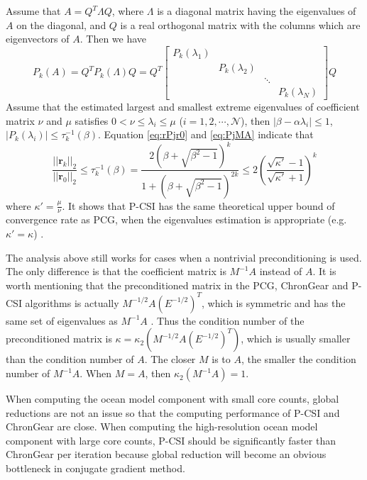 Assume that $A= Q^T\Lambda Q$, where $\Lambda$ is a diagonal matrix having the eigenvalues of $A$ on the diagonal, and $Q$ is a real orthogonal matrix with the columns which are eigenvectors of $A$.
Then we have
\begin{equation}
P_k(A) = Q^T P_k(\Lambda)Q = Q^T \left [\begin{array}{cccc}
P_k(\lambda_1) & & &\\
& P_k(\lambda_2) & &\\
& & \ddots &\\
 & & & P_k(\lambda_N)
\end{array} \right ] Q \label{eq:PjMA}
\end{equation}
Assume that the estimated largest and smallest extreme eigenvalues of coefficient matrix $\nu$ and $\mu$ satisfies $0 < \nu \le \lambda_i \le \mu$ ($i = 1, 2, \cdots, \mathcal{N}$), then $|\beta - \alpha \lambda_i| \le 1$, $|P_k(\lambda_i)| \le \tau^{-1}_k (\beta)$.
Equation \ref{eq:rPjr0} and \ref{eq:PjMA} indicate that
\begin{equation}
\label{pcsi_convergence}
\frac{||\textbf{r}_k||_2}{||\textbf{r}_0||_2}  \le  \tau_k^{-1}(\beta) = \frac{2(\beta+\sqrt{\beta^2-1})^k}{1+(\beta+\sqrt{\beta^2-1})^{2k}} \le 2(\frac{\sqrt{\kappa'}-1}{\sqrt{\kappa'}+1})^k
\end{equation}
where $\kappa' = \frac{\mu}{\nu}$.
It shows that P-CSI has the same theoretical upper bound of convergence rate as PCG, when the eigenvalues estimation is appropriate (e.g. $\kappa' =\kappa$) .

The analysis above still works for cases when a nontrivial preconditioning is used.
The only difference is that the coefficient matrix is $M^{-1}A$ instead of $A$.
It is worth mentioning that the preconditioned matrix in the PCG, ChronGear and P-CSI algorithms is actually  $M^{-1/2}A(E^{-1/2})^T$, which is symmetric and has the same set of eigenvalues as $M^{-1}A$ \citep{Shewchuk1994}. Thus the condition number of the preconditioned matrix is $\kappa =  \kappa_2(M^{-1/2}A(E^{-1/2})^T)$, which is usually smaller than the condition number of $A$.
The closer $M$ is to $A$, the smaller the condition number of $M^{-1}A$. When $M = A$, then $\kappa_2(M^{-1 }A ) = 1$.

When computing the ocean model component with small core counts, global reductions are not an issue so that the computing performance of P-CSI and ChronGear are close. When computing the high-resolution ocean model component with large core counts, P-CSI should be significantly faster than ChronGear per iteration because global reduction will become an obvious bottleneck in conjugate gradient method.


